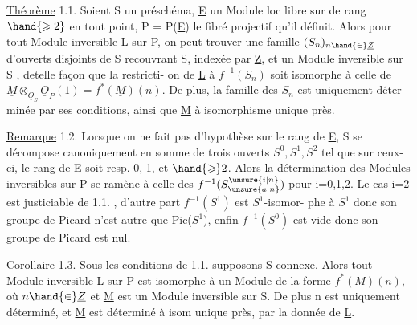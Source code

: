 \uline{Théorème} 1.1. Soient S un préschéma, \underline{E} un Module loc libre sur  de
rang  $\hand{\geqslant 2}$ en tout point,
 P = P(\underline{E}) le fibré projectif qu'il définit. Alors
 pour tout Module inversible \underline{L} sur P, on peut trouver une famille
 $(S_n)_{n\hand{\in}\underline{Z}}$ d'ouverts disjoints de S recouvrant S, indexée par \underline{Z}, et
 un Module inversible  sur S , detelle façon que
 la restricti-%
on de \underline{L} à $f^{-1}(S_n)$ soit isomorphe à celle de $\underline{M}\otimes_{\underline{O}_S}\underline{O}_P(1) = f^*(\underline{M})(n)$.
De plus, la  famille des $S_n$  est uniquement déter-%
minée par ses conditions, ainsi que \underline{M} à isomorphisme unique près.

\uline{Remarque} 1.2. Lorsque on ne fait pas d'hypothèse sur le rang de \underline{E}, S se
décompose canoniquement en somme de trois ouverts $S^0,S^1,S^2$ tel que sur
ceux-ci, le rang de \underline{E} soit resp. 0, 1, et $\hand{\geqslant} 2$. Alors la détermination des
Modules inversibles sur P se ramène à celle des $f^{-1}(S^{\unsure{i|n}}_{\unsure{a|n}})$ pour i=0,1,2.
Le cas i=2 est justiciable de 1.1. , d'autre part $f^{-1}(S^1)$ est $S^1$-isomor-%
phe à $S^1$ donc son groupe de Picard n'est autre que Pic($S^1$), enfin
$f^{-1}(S^0)$ est vide donc son groupe de Picard est nul.

\uline{Corollaire} 1.3. Sous les conditions de 1.1. supposons S connexe. Alors
tout Module inversible \underline{L} sur P est isomorphe à un Module de la forme
$f^*(\underline{M})(n)$, où $n\hand{\in}\underline{Z}$ et \underline{M} est un Module inversible sur S. De plus n est
uniquement déterminé, et \underline{M} est déterminé à isom unique près, par la donnée
de \underline{L}.


